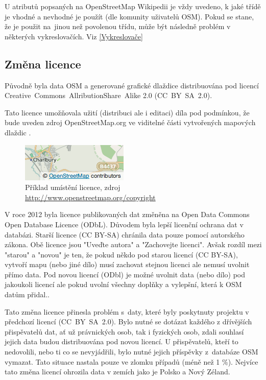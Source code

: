 U atributů popsaných na OpenStreetMap Wikipedii \cite{OSMfeatures} je vždy uvedeno, k jaké třídě je
vhodné a nevhodné je použít (dle komunity uživatelů OSM). Pokud se stane, že je použit
na~jinou než povolenou třídu, může být následně problém v některých vykreslovačích. 
Viz \ref{Vykreslovače}

\subsection{Změna licence}
\label{změna licence}

Původně byla data OSM a generované grafické dlaždice distribuována pod licencí
Creative~Commons~AllributionShare~Alike 2.0 (CC~BY~SA~2.0).

Tato licence umožňovala užití (distribuci ale i editaci) díla pod podmínkou,
že bude uveden zdroj OpenStreetMap.org ve viditelné části
vytvořených mapových dlaždic \cite{OSMlicence}.

  \begin{figure}[hbt]
    \centering
      \includegraphics[scale=0.75]{./pictures/attribution_example.png}
      \caption{Příklad umístění licence,
                zdroj \url{http://www.openstreetmap.org/copyright}}
      \label{fig:attribution_example}
  \end{figure} 

V roce 2012 byla licence publikovaných dat změněna na Open Data Commons
Open Database Licence (ODbL).
Důvodem byla lepší licenční ochrana dat v databázi. 
Starší licence (CC BY-SA) chránila data pouze pomocí autorského zákona. 
Obě licence jsou "Uveďte autora" a "Zachovejte licenci". Avšak rozdíl mezi
"starou" a "novou" je ten, že pokud někdo pod starou licencí (CC BY-SA),
vytvoří mapu (nebo jiné dílo) musí zachovat stejnou licenci ale nemusí uvolnit
přímo data. Pod novou licencí (ODbl) je možné uvolnit data (nebo dílo)
pod jakoukoli licencí ale pokud uvolní všechny doplňky a vylepšní,
která k OSM datům přidal.\cite{OSMlicenceChange}.

Tato změna licence přinesla problém
s~daty, které byly poskytnuty projektu v předchozí licencí
(CC~BY~SA~2.0). Bylo nutné se dotázat každého z dřívějších
přispěvatelů dat, ať už právnických osob, tak i fyzických osob, zdali
souhlasí jejich data budou distribuována pod novou licencí.
U přispěvatelů, kteří to nedovolili, nebo ti co se nevyjádřili,
bylo nutné jejich příspěvky z~databáze OSM vymazat.
Tato situace nastala pouze ve zlomku případů (méně než 1 \%).
Nejvíce tato změna licencí ohrozila data v zemích jako je Polsko a Nový Zéland. \cite {OSMlicenceIssue}

